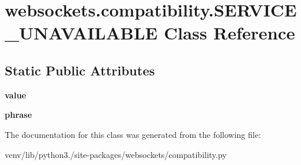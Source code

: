 \hypertarget{classwebsockets_1_1compatibility_1_1_s_e_r_v_i_c_e___u_n_a_v_a_i_l_a_b_l_e}{}\section{websockets.\+compatibility.\+S\+E\+R\+V\+I\+C\+E\+\_\+\+U\+N\+A\+V\+A\+I\+L\+A\+B\+LE Class Reference}
\label{classwebsockets_1_1compatibility_1_1_s_e_r_v_i_c_e___u_n_a_v_a_i_l_a_b_l_e}
\subsection*{Static Public Attributes}
\begin{DoxyCompactItemize}
\item 
\mbox{\label{classwebsockets_1_1compatibility_1_1_s_e_r_v_i_c_e___u_n_a_v_a_i_l_a_b_l_e_ae635a5bfd8e564e6afa396b29f17b231}} 
{\bfseries value}
\item 
\mbox{\label{classwebsockets_1_1compatibility_1_1_s_e_r_v_i_c_e___u_n_a_v_a_i_l_a_b_l_e_aa563fb7fff9eabed929b6d5458990658}} 
{\bfseries phrase}
\end{DoxyCompactItemize}


The documentation for this class was generated from the following file\+:\begin{DoxyCompactItemize}
\item 
venv/lib/python3./site-\/packages/websockets/compatibility.\+py\end{DoxyCompactItemize}
